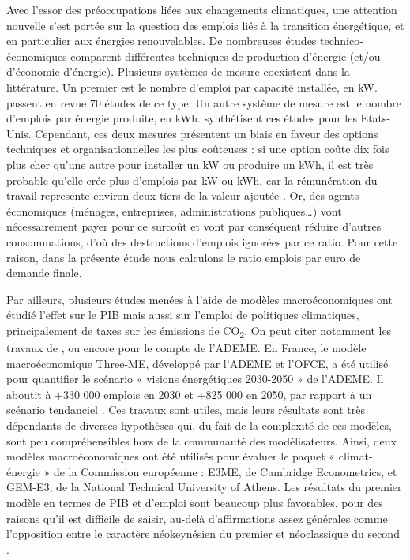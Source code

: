 Avec l’essor des préoccupations liées aux changements climatiques, une attention nouvelle s’est portée sur la question des emplois liés à la transition énergétique, et en particulier aux énergies renouvelables. De nombreuses études technico-économiques comparent différentes techniques de production d’énergie (et/ou d’économie d’énergie). Plusieurs systèmes de mesure coexistent dans la littérature. Un premier est le nombre d’emploi par capacité installée, en kW. \citet{Cameron2015} passent en revue 70 études de ce type. Un autre système de mesure est le nombre d’emplois par énergie produite, en kWh. \citet{Wei2010} synthétisent ces études pour les Etats-Unis. Cependant, ces deux mesures présentent un biais en faveur des options techniques et organisationnelles les plus coûteuses : si une option coûte dix fois plus cher qu'une autre pour installer un kW ou produire un kWh, il est très probable qu'elle crée plus d'emplois par kW ou kWh, car la rémunération du travail represente environ deux tiers de la valeur ajoutée \citep{Cotis2009}. Or, des agents économiques (ménages, entreprises, administrations publiques…) vont nécessairement payer pour ce surcoût et vont par conséquent réduire d'autres consommations, d’où des destructions d’emplois ignorées par ce ratio. Pour cette raison, dans la présente étude nous calculons le ratio emplois par euro de demande finale.

Par ailleurs, plusieurs études menées à l’aide de modèles macroéconomiques ont étudié l’effet sur le PIB mais aussi sur l’emploi de politiques climatiques, principalement de taxes sur les émissions de CO\textsubscript{2}. On peut citer notamment les travaux de \citet{Lehr2008}, \citet{Lehr2012} ou encore \citet{EY2015} pour le compte de l’ADEME. En France, le modèle macroéconomique Three-ME, développé par l’ADEME et l’OFCE, a été utilisé pour quantifier le scénario « visions énergétiques 2030-2050 » de l’ADEME. Il aboutit à +330 000 emplois en 2030 et +825 000 en 2050, par rapport à un scénario tendanciel \citep{ADEME2013}. Ces travaux sont utiles, mais leurs résultats sont très dépendants de diverses hypothèses qui, du fait de la complexité de ces modèles, sont peu compréhensibles hors de la communauté des modélisateurs. Ainsi, deux modèles macroéconomiques ont été utilisés pour évaluer le paquet « climat-énergie » de la Commission européenne : E3ME, de Cambridge Econometrics, et GEM-E3, de la National Technical University of Athens. Les résultats du premier modèle en termes de PIB et d’emploi sont beaucoup plus favorables, pour des raisons qu’il est difficile de saisir, au-delà d’affirmations assez générales comme l’opposition entre le caractère néokeynésien du premier et néoclassique du second \citep{Bruyn2014}.

